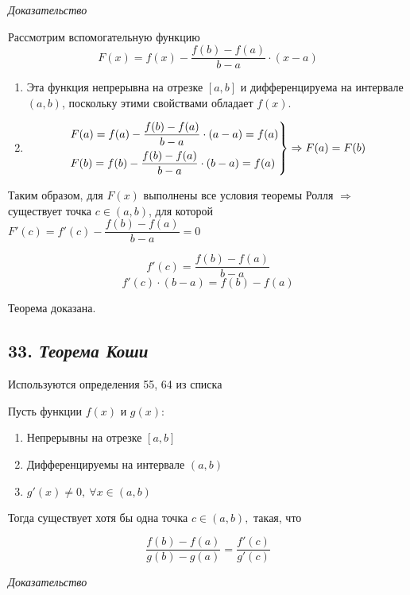 \textit{Доказательство}

Рассмотрим вспомогательную функцию $$F(x) = f(x) - \dfrac{f(b) - f(a)}{b - a}\cdot (x - a)$$
\begin{enumerate}

\item Эта функция непрерывна на отрезке $[a, b]$ и дифференцируема на интервале $(a, b)$, поскольку этими свойствами обладает $f(x)$.
\item $$\begin{rcases}
    F(a) =f(a) - {\dfrac{f(b) - f(a)}{b - a}}\cdot (a - a) = f(a)\\
    F(b) = f(b) - {\dfrac{f(b) - f(a)}{b - a}}\cdot (b - a) = f(a)
    \end{rcases} \Rightarrow F(a) = F(b)
    $$

\end{enumerate}

Таким образом, для $F(x)$ выполнены все условия теоремы Ролля $\Rightarrow$ существует точка $c \in (a, b)$, для которой $F'(c) = f'(c) - {\dfrac{f(b) - f(a)}{b - a}}= 0$

$$f'(c) = {\dfrac{f(b) - f(a)}{b - a}}$$ $$f'(c)\cdot (b - a) = f(b) - f(a)$$

Теорема доказана.
\newpage 
\subsection*{33. \textit{Теорема Коши}}
\begin{Quote2} 
\small\centering 

Используются определения 55, 64 из списка \end{Quote2} 

Пусть функции $f(x)$ и $g(x)$:
\begin{enumerate}

\item Непрерывны на отрезке $[a, b]$
\item Дифференцируемы на интервале $(a, b)$
\item $g'(x) \neq 0, \ \forall x \in (a, b)$

\end{enumerate}

Тогда существует хотя бы одна точка $c \in (a, b),$ такая, что

$$
\dfrac{f(b) - f(a)}{g(b)-g(a)} = \dfrac{f'(c)}{g'(c)}
$$
\vspace*{20pt} 

\textit{Доказательство}

